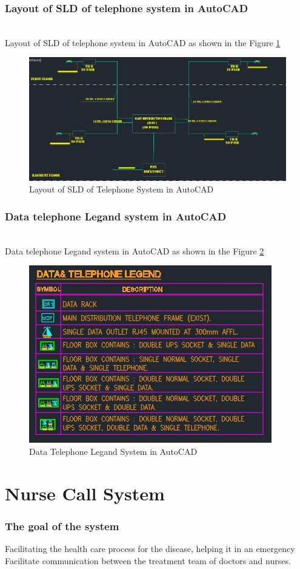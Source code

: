 \documentclass[12pt,fleqn]{book} %
\begin{document}
\subsubsection{Layout of SLD of telephone system in AutoCAD}
\\ Layout of SLD of telephone system in AutoCAD as shown in the Figure \ref{fig:hamdy new 3}
\begin{figure}[!h]
    \centering
    \includegraphics[width=0.6\linewidth]{hamdy new 3.png}
    \caption{Layout of SLD of Telephone System in AutoCAD}
    \label{fig:hamdy new 3}
    \end{figure}
\subsubsection{Data telephone Legand system in AutoCAD}
\\ Data telephone Legand system in AutoCAD as shown in the Figure \ref{fig:hamdy new 4}
\begin{figure}[!h]
    \centering
    \includegraphics[width=0.6\linewidth]{hamdy new 4.png}
    \caption{Data Telephone Legand System in AutoCAD}
    \label{fig:hamdy new 4}
    \end{figure}
    \newpage
\section{Nurse Call System}
\subsubsection{The goal of the system}
Facilitating the health care process for the disease, helping it in an emergency Facilitate communication between the treatment team of doctors and nurses.
\end{document}
